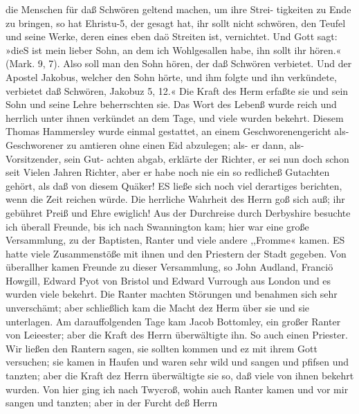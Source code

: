 die Menschen für daß Schwören geltend machen, um ihre Strei-
tigkeiten zu Ende zu bringen, so hat Ehristu-5, der gesagt hat,
ihr sollt nicht schwören, den Teufel und seine Werke, deren eines
eben daö Streiten ist, vernichtet. Und Gott sagt: »dieS ist mein
lieber Sohn, an dem ich Wohlgesallen habe, ihn sollt ihr hören.«
(Mark. 9, 7). Also soll man den Sohn hören, der daß Schwören
verbietet. Und der Apostel Jakobus, welcher den Sohn hörte,
und ihm folgte und ihn verkündete, verbietet daß Schwören,
Jakobuz 5, 12.« Die Kraft des Herm erfaßte sie und sein
Sohn und seine Lehre beherrschten sie. Das Wort des Lebenß
wurde reich und herrlich unter ihnen verkündet an dem Tage,
und viele wurden bekehrt.
Diesem Thomas Hammersley wurde einmal gestattet, an
einem Geschworenengericht als- Geschworener zu amtieren ohne
einen Eid abzulegen; als- er dann, als- Vorsitzender, sein Gut-
achten abgab, erklärte der Richter, er sei nun doch schon seit Vielen
Jahren Richter, aber er habe noch nie ein so redlicheß Gutachten
gehört, als daß von diesem Quäker! ES ließe sich noch viel
derartiges berichten, wenn die Zeit reichen würde. Die herrliche
Wahrheit des Herrn goß sich auß; ihr gebühret Preiß und Ehre
ewiglich!
Aus der Durchreise durch Derbyshire besuchte ich überall
Freunde, bis ich nach Swannington kam; hier war eine große
Versammlung, zu der Baptisten, Ranter und viele andere ,,Fromme«
kamen. ES hatte viele Zusammenstöße mit ihnen und den Priestern
der Stadt gegeben. Von überallher kamen Freunde zu dieser
Versammlung, so John Audland, Franciö Howgill, Edward Pyot
von Bristol und Edward Vurrough aus London und es wurden
viele bekehrt. Die Ranter machten Störungen und benahmen sich
sehr unverschämt; aber schließlich kam die Macht dez Herm über
sie und sie unterlagen. Am darauffolgenden Tage kam Jacob
Bottomley, ein großer Ranter von Leieester; aber die Kraft des
Herrn überwältigte ihn. So auch einen Priester. Wir ließen
den Rantern sagen, sie sollten kommen und ez mit ihrem Gott
versuchen; sie kamen in Haufen und waren sehr wild und sangen
und pfifsen und tanzten; aber die Kraft dez Herrn überwältigte
sie so, daß viele von ihnen bekehrt wurden.
Von hier ging ich nach Twycroß, wohin auch Ranter kamen
und vor mir sangen und tanzten; aber in der Furcht deß Herrn


